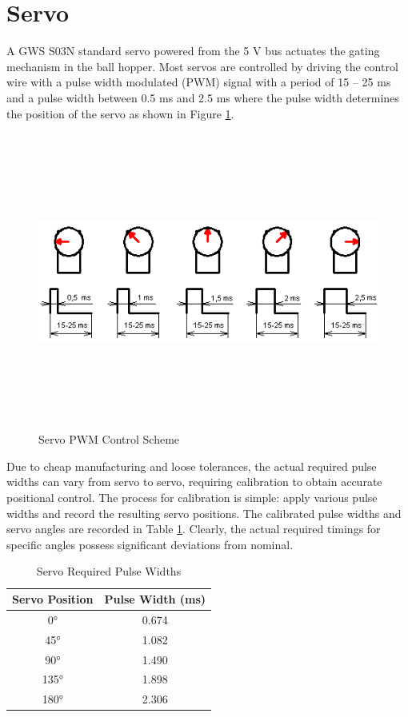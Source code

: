 \section{Servo}
A GWS S03N standard servo powered from the 5 V bus actuates the gating mechanism in the ball hopper. Most servos are controlled by driving the control wire with a pulse width modulated (PWM) signal with a period of 15 -- 25 ms and a pulse width between 0.5 ms and 2.5 ms where the pulse width determines the position of the servo as shown in Figure \ref{fig:servo_pulse_width}. 

\begin{figure}[H]   %
	\centering \includegraphics[width=6in, height=3.85in, keepaspectratio]{figures/servo_pulse_width.png}
	\caption{Servo PWM Control Scheme \cite{servo_pulse_width}}\label{fig:servo_pulse_width}
\end{figure}

Due to cheap manufacturing and loose tolerances, the actual required pulse widths can vary from servo to servo, requiring calibration to obtain accurate positional control. The process for calibration is simple: apply various pulse widths and record the resulting servo positions. The calibrated pulse widths and servo angles are recorded in Table \ref{tab:servo_angles}. Clearly, the actual required timings for specific angles possess significant deviations from nominal. 

\begin{table}[h]
	\centering	\caption{Servo Required Pulse Widths}
	\begin{tabular}{cc}
		\hline 
		Servo Position & Pulse Width (ms) \\ \hline 
		\ang{0} & 0.674 \\ \hline 
		\ang{45} & 1.082 \\ \hline 
		\ang{90} & 1.490 \\ \hline 
		\ang{135} & 1.898 \\ \hline 
		\ang{180} & 2.306 \\ \hline 
	\end{tabular} 
	\label{tab:servo_angles}
\end{table}

